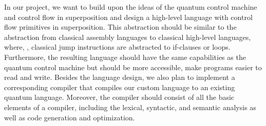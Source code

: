 In our project, we want to build upon the ideas of the quantum control machine and control flow in superposition and design a high-level language with control flow primitives in superposition. This abstraction should be similar to the abstraction from classical assembly languages to classical high-level languages, where, \eg, classical jump instructions are abstracted to if-clauses or loops. Furthermore, the resulting language should have the same capabilities as the quantum control machine but should be more accessible, \ie make programs easier to read and write.
Besides the language design, we also plan to implement a corresponding compiler that compiles our custom language to an existing quantum language. Moreover, the compiler should consist of all the basic elements of a compiler, including the lexical, syntactic, and semantic analysis as well as code generation and optimization.